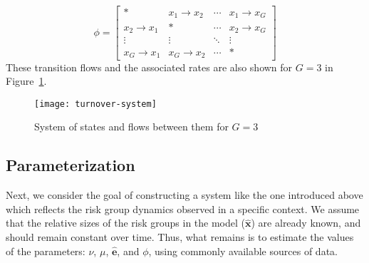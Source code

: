 \begin{equation}\label{eq:phi}
\phi = \left[\begin{array}{cccc}
	         *          & x_1  \rightarrow x_2 & \cdots & x_1 \rightarrow x_G \\[0.5em]
	x_2 \rightarrow x_1 &          *           & \cdots & x_2 \rightarrow x_G \\[0.5em]
	      \vdots        &        \vdots        & \ddots &       \vdots        \\[0.5em]
	x_G \rightarrow x_1 & x_G \rightarrow x_2  & \cdots &          *
\end{array}\right]
\end{equation}
These transition flows and the associated rates
are also shown for $G = 3$ in Figure~\ref{fig:system}.
\begin{figure}
  \centering
  \texttt{[image: turnover-system]}
  \caption{System of states and flows between them for $G = 3$}
  \label{fig:system}
\end{figure}
\subsection{Parameterization}\label{ss:params}
Next, we consider the goal of constructing a system like the one introduced above
which reflects the risk group dynamics observed in a specific context.
We assume that the relative sizes of the risk groups in the model ($\bm{\hat{x}}$)
are already known, and should remain constant over time.
Thus, what remains is to estimate the values of the parameters:
$\nu$, $\mu$, $\bm{\hat{e}}$, and $\phi$,
using commonly available sources of data.


